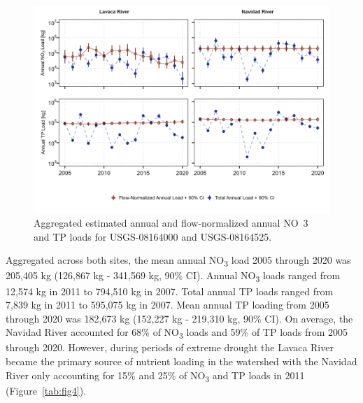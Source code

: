 \documentclass[sn-basic,referee,lineno,pdflatex]{sn-jnl}
\begin{document}
\begin{figure}

{\centering \includegraphics[width=1\linewidth,]{Schramm-2023-05-AS_files/figure-latex/fig3-1} 

}

\caption{Aggregated estimated annual and flow-normalized annual NO~3~ and TP loads for USGS-08164000 and USGS-08164525.}\label{fig:fig3}
\end{figure}

Aggregated across both sites, the mean annual NO\textsubscript{3} load
2005 through 2020 was 205,405 kg (126,867 kg - 341,569 kg, 90\% CI).
Annual NO\textsubscript{3} loads ranged from 12,574 kg in 2011 to
794,510 kg in 2007. Total annual TP loads ranged from 7,839 kg in 2011
to 595,075 kg in 2007. Mean annual TP loading from 2005 through 2020 was
182,673 kg (152,227 kg - 219,310 kg, 90\% CI). On average, the Navidad
River accounted for 68\% of NO\textsubscript{3} loads and 59\% of TP
loads from 2005 through 2020. However, during periods of extreme drought
the Lavaca River became the primary source of nutrient loading in the
watershed with the Navidad River only accounting for 15\% and 25\% of
NO\textsubscript{3} and TP loads in 2011 (Figure~\ref{tab:fig4}).
\end{document}
